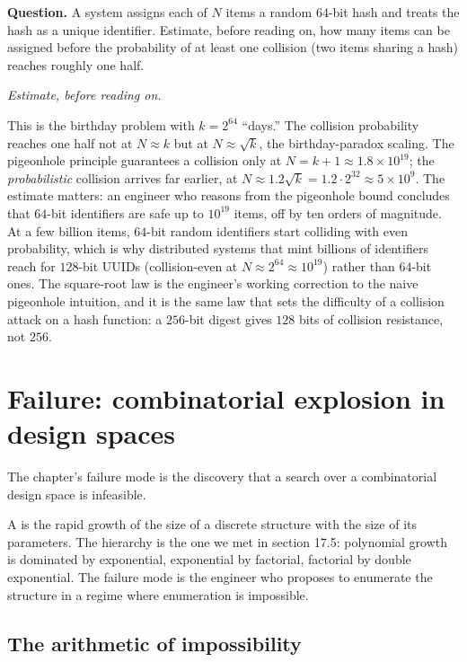 \begin{estimation}
\textbf{Question.} A system assigns each of $N$ items a random
$64$-bit hash and treats the hash as a unique identifier. Estimate,
before reading on, how many items can be assigned before the
probability of at least one collision (two items sharing a hash)
reaches roughly one half.

\smallskip
\textit{Estimate, before reading on.}

\smallskip
This is the birthday problem with $k = 2^{64}$ ``days.'' The
collision probability reaches one half not at $N \approx k$ but at
$N \approx \sqrt{k}$, the birthday-paradox scaling. The pigeonhole
principle guarantees a collision only at $N = k + 1 \approx 1.8
\times 10^{19}$; the \emph{probabilistic} collision arrives far
earlier, at $N \approx 1.2 \sqrt{k} = 1.2 \cdot 2^{32} \approx 5
\times 10^{9}$. The estimate matters: an engineer who reasons from
the pigeonhole bound concludes that $64$-bit identifiers are safe up
to $10^{19}$ items, off by ten orders of magnitude. At a few billion
items, $64$-bit random identifiers start colliding with even
probability, which is why distributed systems that mint billions of
identifiers reach for $128$-bit UUIDs (collision-even at $N \approx
2^{64} \approx 10^{19}$) rather than $64$-bit ones. The square-root
law is the engineer's working correction to the naive pigeonhole
intuition, and it is the same law that sets the difficulty of a
collision attack on a hash function: a $256$-bit digest gives $128$
bits of collision resistance, not $256$.
\end{estimation}

\section{Failure: combinatorial explosion in design spaces}

The chapter's failure mode is the discovery that a search over a
combinatorial design space is infeasible.

A  is the rapid growth of the
size of a discrete structure with the size of its parameters. The
hierarchy is the one we met in section 17.5: polynomial growth is
dominated by exponential, exponential by factorial, factorial by
double exponential. The failure mode is the engineer who proposes
to enumerate the structure in a regime where enumeration is
impossible.

\subsection{The arithmetic of impossibility}


